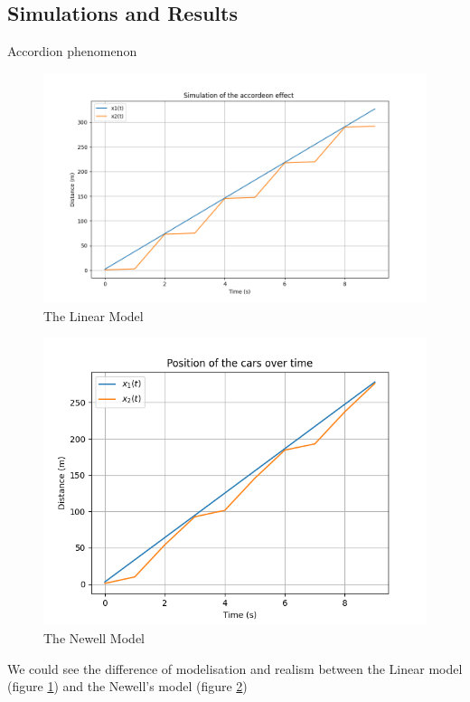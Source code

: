 \documentclass{beamer}
\begin{document}
\subsection{Simulations and Results}
\begin{frame}{Accordion phenomenon}
	\begin{minipage}{0.48\textwidth}
		\centering
		\begin{figure}
			\includegraphics[width=\textwidth]{Accordeon1.png}
			\caption{The Linear Model}
			\label{fig:AL}
		\end{figure}
	\end{minipage}\hfill
	\begin{minipage}{0.48\textwidth}
		\centering
		\begin{figure}
			\includegraphics[width=\textwidth]{1W2_Accord.png}
			\caption{The Newell Model}
			\label{fig:AN}
		\end{figure}
	\end{minipage}
	\begin{block}{}
		We could see the difference of modelisation and realism between the Linear model (figure \ref{fig:AL}) and the Newell's model (figure \ref{fig:AN})
	\end{block}
\end{frame}
\end{document}
